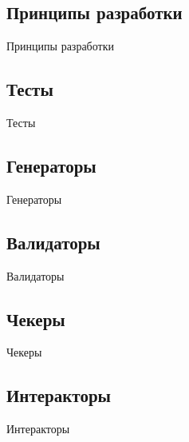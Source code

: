 \subsection*{Принципы разработки}

Принципы разработки

\subsection*{Тесты}

Тесты

\subsection*{Генераторы}

Генераторы

\subsection*{Валидаторы}

Валидаторы

\subsection*{Чекеры}

Чекеры

\subsection*{Интеракторы}

Интеракторы